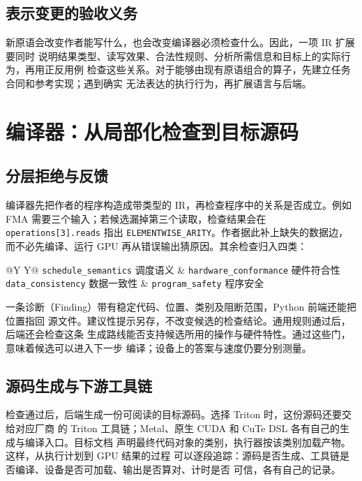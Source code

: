 \documentclass[UTF8,11pt,a4paper,fontset=none]{ctexart}
\newcommand{\code}[1]{\texttt{#1}}
\begin{document}
\subsection{表示变更的验收义务}
新原语会改变作者能写什么，也会改变编译器必须检查什么。因此，一项 IR 扩展要同时
说明结果类型、读写效果、合法性规则、分析所需信息和目标上的实际行为，再用正反用例
检查这些关系。对于能够由现有原语组合的算子，先建立任务合同和参考实现；遇到确实
无法表达的执行行为，再扩展语言与后端\cite{cake,irguide}。

\section{编译器：从局部化检查到目标源码}

\subsection{分层拒绝与反馈}
编译器先把作者的程序构造成带类型的 IR，再检查程序中的关系是否成立。例如 FMA
需要三个输入；若候选漏掉第三个读取，检查结果会在 \code{operations[3].reads}
指出 \code{ELEMENTWISE\_ARITY}。作者据此补上缺失的数据边，而不必先编译、运行 GPU
再从错误输出猜原因。其余检查归入四类：
\begin{notebox}
\noindent\begin{tabularx}{\linewidth}{@{}Y Y@{}}
\code{schedule\_semantics} 调度语义 & \code{hardware\_conformance} 硬件符合性 \\
\code{data\_consistency} 数据一致性 & \code{program\_safety} 程序安全
\end{tabularx}
\end{notebox}
一条诊断（Finding）带有稳定代码、位置、类别及阻断范围，Python 前端还能把位置指回
源文件。建议性提示另存，不改变候选的检查结论。通用规则通过后，后端还会检查这条
生成路线能否支持候选所用的操作与硬件特性。通过这些门，意味着候选可以进入下一步
编译；设备上的答案与速度仍要分别测量\cite{architecture,acceptance}。

\subsection{源码生成与下游工具链}
检查通过后，后端生成一份可阅读的目标源码。选择 Triton 时，这份源码还要交给对应厂商
的 Triton 工具链；Metal、原生 CUDA 和 CuTe DSL 各有自己的生成与编译入口。目标文档
声明最终代码对象的类别，执行器按该类别加载产物。这样，从执行计划到 GPU 结果的过程
可以逐段追踪：源码是否生成、工具链是否编译、设备是否可加载、输出是否算对、计时是否
可信，各有自己的记录\cite{architecture}。
\end{document}

